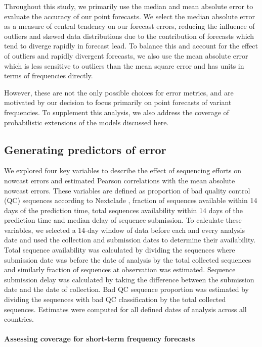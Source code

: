 \documentclass[11pt,oneside,letterpaper]{article}
\begin{document}
Throughout this study, we primarily use the median and mean absolute error to evaluate the accuracy of our point forecasts.
We select the median absolute error as a measure of central tendency on our forecast errors, reducing the influence of outliers and skewed data distributions due to the contribution of forecasts which tend to diverge rapidly in forecast lead. 
To balance this and account for the effect of outliers and rapidly divergent forecasts, we also use the mean absolute error which is less sensitive to outliers than the mean square error and has units in terms of frequencies directly.

However, these are not the only possible choices for error metrics, and are motivated by our decision to focus primarily on point forecasts of variant frequencies.
To supplement this analysis, we also address the coverage of probabilistic extensions of the models discussed here.


\subsection*{Generating predictors of error}

We explored four key variables to describe the effect of sequencing efforts on nowcast errors and estimated Pearson correlations with the mean absolute nowcast errors.
These variables are defined as proportion of bad quality control (QC) sequences according to Nextclade \cite{aksamentov2021nextclade}, fraction of sequences available within 14 days of the prediction time, total sequences availability within 14 days of the prediction time and median delay of sequence submission.
To calculate these variables, we selected a 14-day window of data before each and every analysis date and used the collection and submission dates to determine their availability.
Total sequence availability was calculated by dividing the sequences where submission date was before the date of analysis by the total collected sequences and similarly fraction of sequences at observation was estimated.
Sequence submission delay was calculated by taking the difference between the submission date and the date of collection.
Bad QC sequence proportion was estimated by dividing the sequences with bad QC classification by the total collected sequences.
Estimates were computed for all defined dates of analysis across all countries.

\paragraph{Assessing coverage for short-term frequency forecasts}
\end{document}
